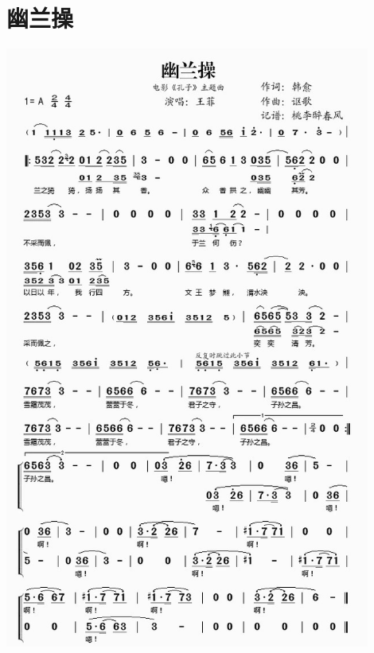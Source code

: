 \documentclass[cn,pad,twocol]{elegantbook}
\begin{document}
\section{幽兰操}\includegraphics[width=0.9\textwidth]{dongxiao/20200819/幽兰操.jpeg}
\end{document}

